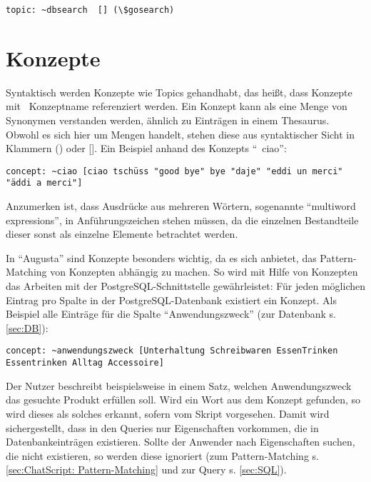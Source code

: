 \begin{lstlisting}[caption={Topicbezeichner in dbsearch.top}]
topic: ~dbsearch  [] (\$gosearch)
\end{lstlisting}


\section{Konzepte}
\label{sec:ChatScript: Konzepte}

Syntaktisch werden Konzepte wie Topics gehandhabt, das heißt, dass Konzepte mit ~Konzeptname referenziert werden. Ein Konzept kann als eine Menge von Synonymen verstanden werden, ähnlich zu Einträgen in einem Thesaurus. Obwohl es sich hier um Mengen handelt, stehen diese aus syntaktischer Sicht in Klammern () oder []. Ein Beispiel anhand des Konzepts "`~ciao"':

\begin{lstlisting}[caption={Konzept 'ciao' aus konzepte.top}]
concept: ~ciao [ciao tschüss "good bye" bye "daje" "eddi un merci" "äddi a merci"]
\end{lstlisting}

Anzumerken ist, dass Ausdrücke aus mehreren Wörtern, sogenannte "`multiword expressions"', in Anführungszeichen stehen müssen, da die einzelnen Bestandteile dieser sonst als einzelne Elemente betrachtet werden.


In "`Augusta"' sind Konzepte besonders wichtig, da es sich anbietet, das Pattern-Matching von Konzepten abhängig zu machen. So wird mit Hilfe von Konzepten das Arbeiten mit der PostgreSQL-Schnittstelle gewährleistet: Für jeden möglichen Eintrag pro Spalte in der PostgreSQL-Datenbank existiert ein Konzept. Als Beispiel alle Einträge für die Spalte "`Anwendungszweck"' (zur Datenbank s. \ref{sec:DB}):  

\begin{lstlisting}[caption={Konzept 'anwendungszweck' aus konzepte.top}]
concept: ~anwendungszweck [Unterhaltung Schreibwaren EssenTrinken Essentrinken Alltag Accessoire]
\end{lstlisting}

Der Nutzer beschreibt beispielsweise in einem Satz, welchen Anwendungszweck das gesuchte Produkt erfüllen soll. Wird ein Wort aus dem Konzept gefunden, so wird dieses als solches erkannt, \textcolor[rgb]{1,0.41,0.13}{sofern vom Skript vorgesehen.} Damit wird sichergestellt, dass in den Queries nur Eigenschaften vorkommen, die in Datenbankeinträgen existieren. Sollte der Anwender nach Eigenschaften suchen, die nicht existieren, so werden diese ignoriert (zum Pattern-Matching s. \ref{sec:ChatScript: Pattern-Matching} und zur Query s. \ref{sec:SQL}). 

